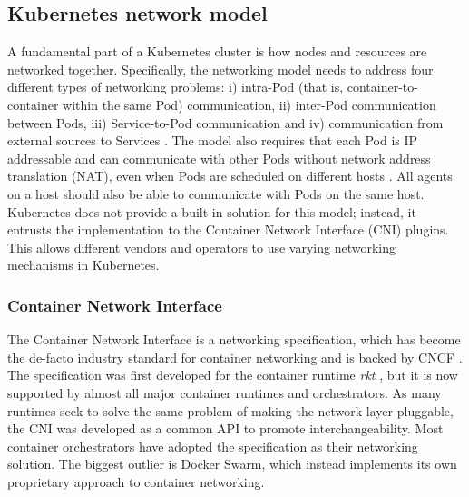 \documentclass[english, 12pt, a4paper, sci, utf8, a-2b, online]{aaltothesis}
\begin{document}
\subsection{Kubernetes network model}

A fundamental part of a Kubernetes cluster is how nodes and resources are networked together.
Specifically, the networking model needs to address four different types of networking problems: i) intra-Pod (that is, container-to-container within the same Pod) communication, ii) inter-Pod communication between Pods, iii) Service-to-Pod communication and iv) communication from external sources to Services \cite{k8s-docs-cluster-networking}.
The model also requires that each Pod is IP addressable and can communicate with other Pods without network address translation (NAT), even when Pods are scheduled on different hosts \cite{qi2020assessing}.
All agents on a host should also be able to communicate with Pods on the same host.
Kubernetes does not provide a built-in solution for this model; instead, it entrusts the implementation to the Container Network Interface (CNI) plugins.
This allows different vendors and operators to use varying networking mechanisms in Kubernetes.

\subsubsection{Container Network Interface} \label{cni}

The Container Network Interface \cite{cni} is a networking specification, which has become the de-facto industry standard for container networking and is backed by CNCF \cite{qi2020assessing}.
The specification was first developed for the container runtime \emph{rkt} \cite{hausenblas2018container}, but it is now supported by almost all major container runtimes and orchestrators.
As many runtimes seek to solve the same problem of making the network layer pluggable, the CNI was developed as a common API to promote interchangeability.
Most container orchestrators have adopted the specification as their networking solution.
The biggest outlier is Docker Swarm, which instead implements its own proprietary approach to container networking.
\end{document}
